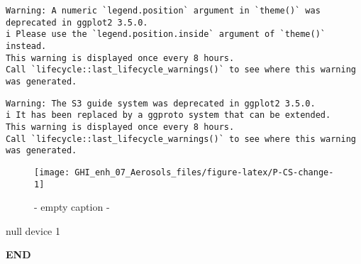 \documentclass[
  10pt,
  a4paper,oneside]{article}
\begin{document}
\begin{verbatim}
Warning: A numeric `legend.position` argument in `theme()` was deprecated in ggplot2 3.5.0.
i Please use the `legend.position.inside` argument of `theme()` instead.
This warning is displayed once every 8 hours.
Call `lifecycle::last_lifecycle_warnings()` to see where this warning was generated.
\end{verbatim}

\begin{verbatim}
Warning: The S3 guide system was deprecated in ggplot2 3.5.0.
i It has been replaced by a ggproto system that can be extended.
This warning is displayed once every 8 hours.
Call `lifecycle::last_lifecycle_warnings()` to see where this warning was generated.
\end{verbatim}

\begin{figure}[H]

{\centering \texttt{[image: GHI\_enh\_07\_Aerosols\_files/figure-latex/P-CS-change-1]} 

}

\caption{ - empty caption - }\label{fig:P-CS-change}
\end{figure}

null device
1

\textbf{END}
\end{document}
